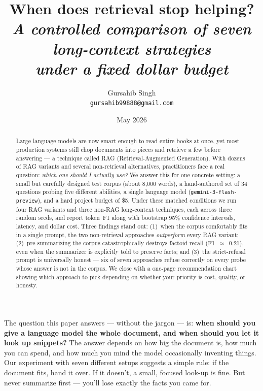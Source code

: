 \documentclass[11pt,a4paper]{article}
\title{
    {\Huge\bfseries When does retrieval stop helping?}\\[0.4em]
    {\Large\itshape A controlled comparison of seven long-context strategies}\\[0.4em]
    {\normalsize\itshape under a fixed dollar budget}
}
\author{Gursahib Singh\\\small\texttt{gursahib99888@gmail.com}}
\date{May 2026}
\begin{document}
\maketitle
\thispagestyle{empty}

\vspace{-1.2em}

\begin{abstract}
\noindent
Large language models are now smart enough to read entire books at once, yet most production systems still chop documents into pieces and retrieve a few before answering — a technique called RAG (Retrieval-Augmented Generation). With dozens of RAG variants and several non-retrieval alternatives, practitioners face a real question: \textit{which one should I actually use?} We answer this for one concrete setting: a small but carefully designed test corpus (about 8{,}000 words), a hand-authored set of 34 questions probing five different abilities, a single language model (\texttt{gemini-3-flash-preview}), and a hard project budget of \$5. Under these matched conditions we run four RAG variants and three non-RAG long-context techniques, each across three random seeds, and report token~F1 along with bootstrap 95\% confidence intervals, latency, and dollar cost. Three findings stand out: (1)~when the corpus comfortably fits in a single prompt, the two non-retrieval approaches \textit{outperform} every RAG variant; (2)~pre-summarizing the corpus catastrophically destroys factoid recall (F1~$\approx$~0.21), even when the summarizer is explicitly told to preserve facts; and (3)~the strict-refusal prompt is universally honest — six of seven approaches refuse correctly on every probe whose answer is not in the corpus. We close with a one-page recommendation chart showing which approach to pick depending on whether your priority is cost, quality, or honesty.
\end{abstract}

\begin{plainEnglish}
The question this paper answers — without the jargon — is: \textbf{when should you give a language model the whole document, and when should you let it look up snippets?} The answer depends on how big the document is, how much you can spend, and how much you mind the model occasionally inventing things. Our experiment with seven different setups suggests a simple rule: if the document fits, hand it over. If it doesn't, a small, focused look-up is fine. But never summarize first — you'll lose exactly the facts you came for.
\end{plainEnglish}
\end{document}
